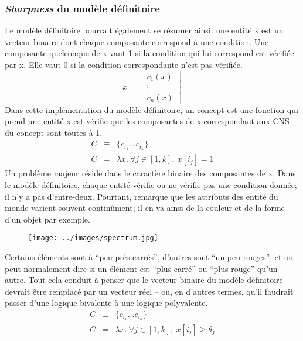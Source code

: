\documentclass[french]{article}
\begin{document}
				\subsubsection{\textit{Sharpness} du modèle définitoire}
				Le modèle définitoire pourrait également se résumer ainsi: une entité x est un vecteur binaire dont chaque composante correspond à une condition. Une  composante quelconque de x vaut 1 si la condition qui lui correspond est vérifiée par x. Elle vaut 0 si la condition correspondante n'est pas vérifiée.
				\begin{equation}
				x = \left[\begin{array}{c}
				c_1(x) \\
				\vdots\\
				c_n(x)
				\end{array}\right]
				\end{equation}
				Dans cette implémentation du modèle définitoire, un concept est une fonction qui prend une entité x est vérifie que les composantes de x correspondant aux CNS du concept sont toutes à 1.
				\begin{eqnarray}
				C &\equiv&  \lbrace c_{i_1} \dots c_{i_k} \rbrace \\
				C &=& \lambda x. \ \forall j \in [1, k], \ x[i_j] = 1
				\end{eqnarray}
				Un problème majeur réside dans le caractère binaire des composantes de x. Dans le modèle définitoire, chaque entité vérifie ou ne vérifie pas une condition donnée; il n'y a pas d'entre-deux. Pourtant, \cite{rosch1973} remarque que les attributs des entité du monde varient souvent continûment; il en va ainsi de la couleur et de la forme d'un objet par exemple.
				\begin{figure}[H]
					\centering
					\texttt{[image: ../images/spectrum.jpg]}
				\end{figure}				
				Certains éléments sont à ``peu près carrés'', d'autres sont ``un peu rouges''; et on peut normalement dire si un élément est ``plus carré'' ou ``plus rouge'' qu'un autre. Tout cela conduit à penser que le vecteur binaire du modèle définitoire devrait être remplacé par un vecteur réel -- ou, en d'autres termes, qu'il faudrait passer d'une logique bivalente à une logique polyvalente.
				\begin{eqnarray}
				C &\equiv&  \lbrace c_{i_1} \dots c_{i_k} \rbrace \\
				C &=& \lambda x. \ \forall j \in [1, k], \ x[i_j] \geq \theta_j
				\end{eqnarray}
\end{document}
